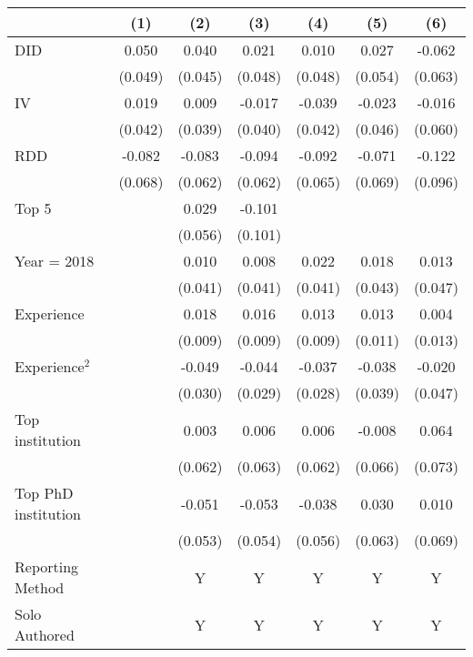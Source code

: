 \begin{tabular}{l*{6}{c}}
\hline\hline
                &\multicolumn{1}{c}{(1)}&\multicolumn{1}{c}{(2)}&\multicolumn{1}{c}{(3)}&\multicolumn{1}{c}{(4)}&\multicolumn{1}{c}{(5)}&\multicolumn{1}{c}{(6)}\\
\hline
DID             &    0.050&    0.040&    0.021&    0.010&    0.027&   -0.062\\
                &  (0.049)&  (0.045)&  (0.048)&  (0.048)&  (0.054)&  (0.063)\\
IV              &    0.019&    0.009&   -0.017&   -0.039&   -0.023&   -0.016\\
                &  (0.042)&  (0.039)&  (0.040)&  (0.042)&  (0.046)&  (0.060)\\
RDD             &   -0.082&   -0.083&   -0.094&   -0.092&   -0.071&   -0.122\\
                &  (0.068)&  (0.062)&  (0.062)&  (0.065)&  (0.069)&  (0.096)\\
Top 5           &         &    0.029&   -0.101&         &         &         \\
                &         &  (0.056)&  (0.101)&         &         &         \\
Year = 2018     &         &    0.010&    0.008&    0.022&    0.018&    0.013\\
                &         &  (0.041)&  (0.041)&  (0.041)&  (0.043)&  (0.047)\\
Experience      &         &    0.018&    0.016&    0.013&    0.013&    0.004\\
                &         &  (0.009)&  (0.009)&  (0.009)&  (0.011)&  (0.013)\\
Experience$^2$  &         &   -0.049&   -0.044&   -0.037&   -0.038&   -0.020\\
                &         &  (0.030)&  (0.029)&  (0.028)&  (0.039)&  (0.047)\\
Top institution &         &    0.003&    0.006&    0.006&   -0.008&    0.064\\
                &         &  (0.062)&  (0.063)&  (0.062)&  (0.066)&  (0.073)\\
Top PhD institution&         &   -0.051&   -0.053&   -0.038&    0.030&    0.010\\
                &         &  (0.053)&  (0.054)&  (0.056)&  (0.063)&  (0.069)\\
Reporting Method &         &        Y&        Y&        Y&        Y&        Y\\
Solo Authored   &         &        Y&        Y&        Y&        Y&        Y\\

\end{tabular}
